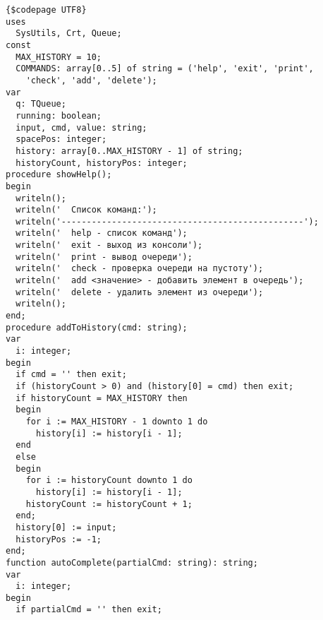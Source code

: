 \documentclass[a4paper,14pt]{extarticle}
\begin{document}
  \noindent
  \begin{Verbatim}[tabsize=4,fontsize=\small]
{$codepage UTF8}
uses 
  SysUtils, Crt, Queue;
const
  MAX_HISTORY = 10;
  COMMANDS: array[0..5] of string = ('help', 'exit', 'print', 
    'check', 'add', 'delete');
var
  q: TQueue;
  running: boolean;
  input, cmd, value: string;
  spacePos: integer;
  history: array[0..MAX_HISTORY - 1] of string;
  historyCount, historyPos: integer;
procedure showHelp();
begin
  writeln();
  writeln('  Список команд:');
  writeln('------------------------------------------------');
  writeln('  help - список команд');
  writeln('  exit - выход из консоли');
  writeln('  print - вывод очереди');
  writeln('  check - проверка очереди на пустоту');
  writeln('  add <значение> - добавить элемент в очередь');
  writeln('  delete - удалить элемент из очереди');
  writeln();
end;
procedure addToHistory(cmd: string);
var
  i: integer;
begin
  if cmd = '' then exit;
  if (historyCount > 0) and (history[0] = cmd) then exit;
  if historyCount = MAX_HISTORY then
  begin
    for i := MAX_HISTORY - 1 downto 1 do
      history[i] := history[i - 1];
  end
  else
  begin
    for i := historyCount downto 1 do
      history[i] := history[i - 1];
    historyCount := historyCount + 1;
  end;
  history[0] := input;
  historyPos := -1;
end;
function autoComplete(partialCmd: string): string;
var
  i: integer;
begin
  if partialCmd = '' then exit;


\end{Verbatim}
\end{document}
